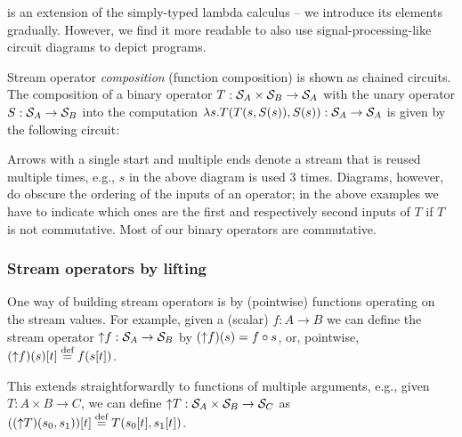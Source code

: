 \dbsp is an extension of the simply-typed lambda calculus -- we
introduce its elements gradually.  However, we find it more readable
to also use signal-processing-like circuit diagrams to depict \dbsp
programs.

Stream operator \emph{composition} (function composition) is shown as chained circuits.
The composition of a binary operator $T: \mathcal{S}_{A} \times \mathcal{S}_{B} \to \mathcal{S}_{A}$ with the
unary operator $S: \mathcal{S}_{A} \to \mathcal{S}_{B}$ into the computation
$\lambda s. T(T(s,S(s)),S(s)) : \mathcal{S}_{A}\to\mathcal{S}_{A}$
is given by the following circuit:

\begin{center}
\end{center}

Arrows with a single start and multiple
ends denote a stream that is reused multiple times, e.g., $s$
in the above diagram is used 3 times.  Diagrams, however, do obscure the
ordering of the inputs of an operator; in the above examples
we have to indicate which ones are the first and respectively second inputs of $T$
if $T$ is not commutative.  Most of our binary operators are commutative.

\subsubsection{Stream operators by lifting}\label{sec:lifting}

One way of building stream operators is by (pointwise) 
functions operating on the stream values. For example, given a (scalar)
$f: A \to B$ we can define the stream operator
${\uparrow}f :\mathcal{S}_{A} \to \mathcal{S}_{B}$ by $({\uparrow}f)(s)=f \circ s$,
or, pointwise, $({\uparrow}f)(s)[t] \stackrel{\textrm{\scriptsize def}}{=} f(s[t])$.

This extends straightforwardly to functions of multiple arguments, e.g.,
given $T: A \times B \rightarrow C$, we can define ${\uparrow}T: \mathcal{S}_{A} \times \mathcal{S}_{B}
\rightarrow \mathcal{S}_{C}$ as $(({\uparrow}T)(s_0, s_1))[t] \stackrel{\textrm{\scriptsize def}}{=} T(s_0[t], s_1[t])$.

